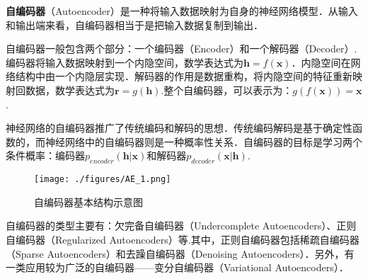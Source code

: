 
\textbf{自编码器}（Autoencoder）是一种将输入数据映射为自身的神经网络模型．从输入和输出端来看，自编码器相当于是把输入数据复制到输出．

自编码器一般包含两个部分：一个编码器（Encoder）和一个解码器（Decoder）.编码器将输入数据映射到一个内隐空间，数学表达式为$\boldsymbol{h}=f(\boldsymbol{x})$．内隐空间在网络结构中由一个内隐层实现．解码器的作用是数据重构，将内隐空间的特征重新映射回数据，数学表达式为$\boldsymbol{r}=g(\boldsymbol{h})$.整个自编码器，可以表示为：$g(f(\boldsymbol{x}))=\boldsymbol{x}$.

神经网络的自编码器推广了传统编码和解码的思想．传统编码解码是基于确定性函数的，而神经网络中的自编码器则是一种概率性关系．自编码器的目标是学习两个条件概率：编码器$p_{encoder}(\boldsymbol{h}|\boldsymbol{x})$和解码器$p_{decoder}(\boldsymbol{x}|\boldsymbol{h})$\cite{GDL}.

\begin{figure}[ht]
\centering
\texttt{[image: ./figures/AE\_1.png]}
\caption{自编码器基本结构示意图 \cite{GDL}} \label{AE_fig1} 
\end{figure}

自编码器的类型主要有：欠完备自编码器（Undercomplete Autoencoders）、正则自编码器（Regularized Autoencoders）等.其中，正则自编码器包括稀疏自编码器（Sparse Autoencoders）和去躁自编码器（Denoising Autoencoders）．另外，有一类应用较为广泛的自编码器——变分自编码器（Variational Autoencoders）．